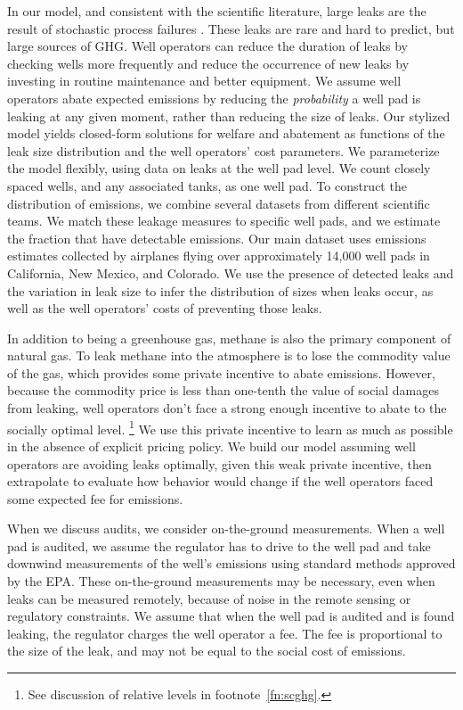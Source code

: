 \documentclass[12pt,oneside,letterpaper]{article}
\theoremstyle{definition}
\begin{document}
\begin{refsection}
In our model, and consistent with the scientific literature, large leaks are the result of stochastic process failures
\parencite{Lyon/Alvarez/Zavala-Araiza/Brandt/Jackson/Hamburg:2016, ZavalaAraiza/etal:2017}.
These leaks are rare and hard to predict, but large sources of \gls{GHG}.
Well operators can reduce the duration of leaks by checking wells more frequently and reduce the occurrence of new leaks by investing in routine maintenance and better equipment.
We assume well operators abate expected emissions by reducing the \emph{probability} a well pad is leaking at any given moment, rather than reducing the size of leaks.
Our stylized model yields closed-form solutions for welfare and abatement as functions of the leak size distribution and the well operators' cost parameters.
We parameterize the model flexibly, using data on leaks at the well pad level.
We count closely spaced wells, and any associated tanks, as one well pad.
To construct the distribution of emissions, we combine several datasets from different scientific teams.
We match these leakage measures to specific well pads, and we estimate the fraction that have detectable emissions.
Our main dataset uses emissions estimates collected by airplanes flying over approximately 14,000 well pads in California, New Mexico, and Colorado.
We use the presence of detected leaks and the variation in leak size to infer the distribution of sizes when leaks occur, as well as the well operators' costs of preventing those leaks.


In addition to being a greenhouse gas, methane is also the primary component of natural gas.
To leak methane into the atmosphere is to lose the commodity value of the gas,
which provides some private incentive to abate emissions.
However, because the commodity price is less than one-tenth the value of social damages from leaking, well operators don't face a strong enough incentive to abate to the socially optimal level.%
\footnote{See discussion of relative levels in footnote~\ref{fn:scghg}.}
We use this private incentive to learn as much as possible in the absence of explicit pricing policy.
We build our model assuming well operators are avoiding leaks optimally, given this weak private incentive, then extrapolate to evaluate how behavior would change if the well operators faced some expected fee for emissions.

When we discuss audits, we consider on-the-ground measurements.
When a well pad is audited, we assume the regulator has to drive to the well pad and take downwind measurements of the well's emissions using standard methods approved by the \gls{EPA}.
These on-the-ground measurements may be necessary, even when leaks can be measured remotely, because of noise in the remote sensing or regulatory constraints.
We assume that when the well pad is audited and is found leaking, the regulator charges the well operator a fee.
The fee is proportional to the size of the leak, and may not be equal to the social cost of emissions.


\end{refsection}
\end{document}
